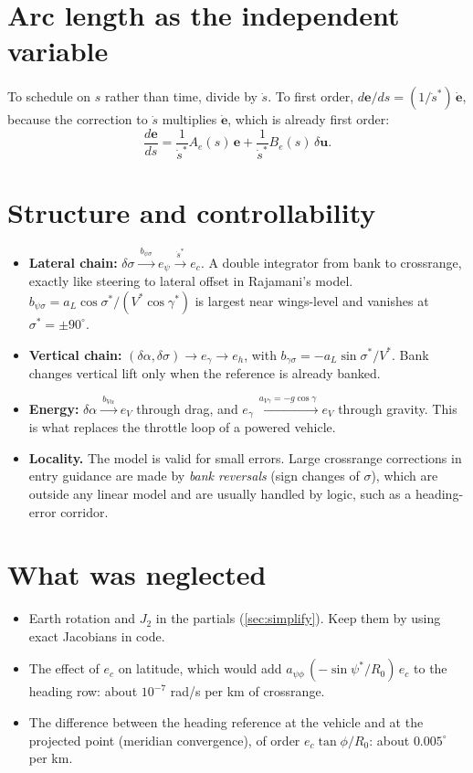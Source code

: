 \documentclass[11pt]{report}
\numberwithin{equation}{chapter}
\newcommand{\vb}[1]{\bm{#1}}
\newcommand{\aL}{a_L}
\newcommand{\sdot}{\dot s}
\begin{document}
\section{Arc length as the independent variable}

To schedule on $s$ rather than time, divide by $\sdot$. To first order,
$d\vb e/ds = (1/\sdot^*)\,\dot{\vb e}$, because the correction to $\sdot$ multiplies $\dot{\vb e}$,
which is already first order:
\begin{equation}
  \frac{d\vb e}{ds} = \frac{1}{\sdot^*}A_e(s)\,\vb e + \frac{1}{\sdot^*}B_e(s)\,\delta\vb u .
\end{equation}

\section{Structure and controllability}

\begin{itemize}
\item \textbf{Lateral chain:} $\delta\sigma \xrightarrow{\ b_{\psi\sigma}\ } e_\psi
  \xrightarrow{\ \sdot^*\ } e_c$. A double integrator from bank to crossrange, exactly like
  steering to lateral offset in Rajamani's model. $b_{\psi\sigma} = \aL\cos\sigma^*/(V^*\cos\gamma^*)$
  is largest near wings-level and vanishes at $\sigma^* = \pm90^\circ$.
\item \textbf{Vertical chain:} $(\delta\alpha,\delta\sigma) \to e_\gamma \to e_h$, with
  $b_{\gamma\sigma} = -\aL\sin\sigma^*/V^*$. Bank changes vertical lift only when the
  reference is already banked.
\item \textbf{Energy:} $\delta\alpha \xrightarrow{\ b_{V\alpha}\ } e_V$ through drag, and
  $e_\gamma \xrightarrow{\ a_{V\gamma}=-g\cos\gamma\ } e_V$ through gravity. This is what
  replaces the throttle loop of a powered vehicle.
\item \textbf{Locality.} The model is valid for small errors. Large crossrange corrections in
  entry guidance are made by \emph{bank reversals} (sign changes of $\sigma$), which are
  outside any linear model and are usually handled by logic, such as a heading-error
  corridor.
\end{itemize}

\section{What was neglected}

\begin{itemize}
\item Earth rotation and $J_2$ in the partials (\cref{sec:simplify}). Keep them by using exact
  Jacobians in code.
\item The effect of $e_c$ on latitude, which would add $a_{\psi\phi}\,(-\sin\psi^*/R_0)\,e_c$ to
  the heading row: about $10^{-7}$ rad/s per km of crossrange.
\item The difference between the heading reference at the vehicle and at the projected
  point (meridian convergence), of order $e_c\tan\phi/R_0$: about $0.005^\circ$ per km.
\end{itemize}
\end{document}
